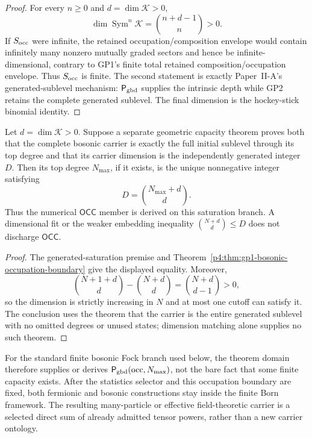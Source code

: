 \documentclass[12pt,a4paper]{article}
\begin{document}
\begin{proof}
For every \(n\ge0\) and \(d=\dim\mathcal K>0\),
\[
 \dim\operatorname{Sym}^n\mathcal K
 =\binom{n+d-1}{n}>0.
\]
If \(S_{\rm occ}\) were infinite, the retained occupation/composition envelope
would contain infinitely many nonzero mutually graded sectors and hence be
infinite-dimensional, contrary to GP1's finite total retained
composition/occupation envelope.  Thus \(S_{\rm occ}\) is finite.  The
second statement is exactly Paper~II-A's generated-sublevel mechanism:
\(\mathsf P_{\rm gbd}\) supplies the intrinsic depth while GP2 retains the
complete generated sublevel.  The final dimension is the hockey-stick
binomial identity.
\end{proof}

\begin{corollary}
\label{p4:cor:occupation-cutoff-saturation}
Let \(d=\dim\mathcal K>0\).  Suppose a separate geometric capacity theorem
proves both that the complete bosonic carrier is exactly the full initial
sublevel through its top degree and that its carrier dimension is the
independently generated integer \(D\).  Then its top degree \(N_{\max}\), if
it exists, is the unique nonnegative integer satisfying
\[
 \boxed{D=\binom{N_{\max}+d}{d}.}
\]
Thus the numerical \(\mathsf{OCC}\) member is derived on this saturation
branch.  A dimensional fit or the weaker embedding inequality
\(\binom{N+d}{d}\le D\) does not discharge \(\mathsf{OCC}\).
\end{corollary}

\begin{proof}
The generated-saturation premise and
Theorem~\ref{p4:thm:gp1-bosonic-occupation-boundary} give the displayed
equality.  Moreover,
\[
 \binom{N+1+d}{d}-\binom{N+d}{d}
 =\binom{N+d}{d-1}>0,
\]
so the dimension is strictly increasing in \(N\) and at most one cutoff can
satisfy it.  The conclusion uses the theorem that the carrier is the entire
generated sublevel with no omitted degrees or unused states; dimension
matching alone supplies no such theorem.
\end{proof}

For the standard finite bosonic Fock branch used below, the theorem domain
therefore supplies or derives \(\mathsf P_{\rm gbd}(\mathrm{occ},N_{\max})\),
not the bare fact that some finite capacity exists.  After the statistics
selector and this occupation boundary are fixed, both fermionic and bosonic
constructions stay inside the finite Born framework.  The resulting
many-particle or effective field-theoretic carrier is a selected direct sum of
already admitted tensor powers, rather than a new carrier ontology.
\end{document}
